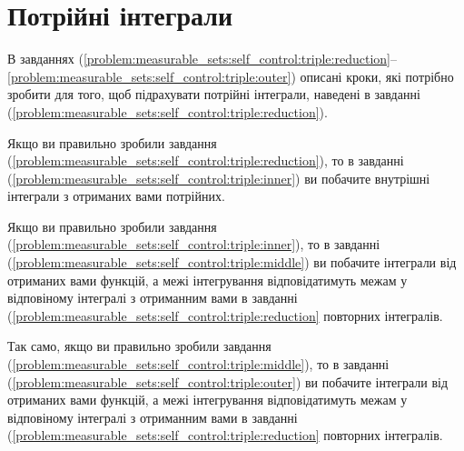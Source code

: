 \section{Потрійні інтеграли}
В завданнях (\ref{problem:measurable_sets:self_control:triple:reduction}--\ref{problem:measurable_sets:self_control:triple:outer}) описані кроки, які потрібно зробити для того, щоб підрахувати потрійні інтеграли, наведені в завданні  (\ref{problem:measurable_sets:self_control:triple:reduction}).

Якщо ви правильно зробили завдання  (\ref{problem:measurable_sets:self_control:triple:reduction}), то в завданні (\ref{problem:measurable_sets:self_control:triple:inner}) ви побачите внутрішні інтеграли з отриманих вами потрійних.

Якщо ви правильно зробили завдання  (\ref{problem:measurable_sets:self_control:triple:inner}), то в завданні (\ref{problem:measurable_sets:self_control:triple:middle}) ви побачите інтеграли від отриманих вами функцій, а межі інтегрування відповідатимуть межам у відповіному інтегралі з отриманним вами в завданні (\ref{problem:measurable_sets:self_control:triple:reduction} повторних інтегралів.

Так само, якщо ви правильно зробили завдання  (\ref{problem:measurable_sets:self_control:triple:middle}), то в завданні (\ref{problem:measurable_sets:self_control:triple:outer}) ви побачите інтеграли від отриманих вами функцій, а межі інтегрування відповідатимуть межам у відповіному інтегралі з отриманним вами в завданні (\ref{problem:measurable_sets:self_control:triple:reduction} повторних інтегралів.

